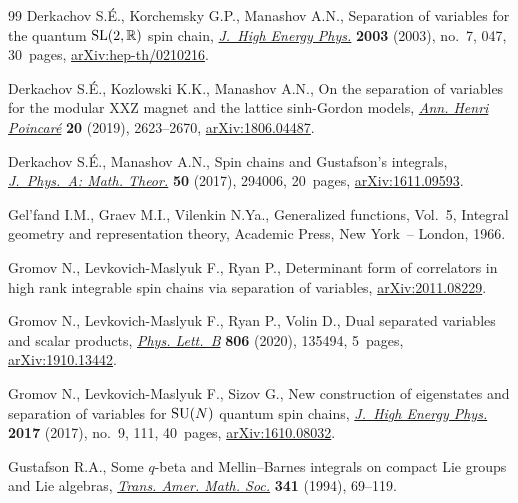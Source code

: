 \documentclass[pdftex]{sigma}%
\numberwithin{equation}{section}
\begin{document}
\begin{thebibliography}{99}
Derkachov S.\'E., Korchemsky G.P., Manashov A.N., Separation of variables for the
 quantum {${\rm SL}(2,\mathbb R)$} spin chain, \href{https://doi.org/10.1088/1126-6708/2003/07/047}{\textit{J.~High Energy Phys.}}
 \textbf{2003} (2003), no.~7, 047, 30~pages, \href{https://arxiv.org/abs/hep-th/0210216}{arXiv:hep-th/0210216}.

Derkachov S.\'E., Kozlowski K.K., Manashov A.N., On the separation of variables
 for the modular {XXZ} magnet and the lattice sinh-{G}ordon models,
 \href{https://doi.org/10.1007/s00023-019-00806-2}{\textit{Ann. Henri Poincar\'e}} \textbf{20} (2019), 2623--2670,
 \href{https://arxiv.org/abs/1806.04487}{arXiv:1806.04487}.

Derkachov S.\'E., Manashov A.N., Spin chains and {G}ustafson's integrals,
 \href{https://doi.org/10.1088/1751-8121/aa749a}{\textit{J.~Phys.~A: Math. Theor.}} \textbf{50} (2017), 294006, 20~pages,
 \href{https://arxiv.org/abs/1611.09593}{arXiv:1611.09593}.

Gel'fand I.M., Graev M.I., Vilenkin N.Ya., Generalized functions, {V}ol.~5,
 Integral geometry and representation theory, Academic Press, New York~--
 London, 1966.

Gromov N., Levkovich-Maslyuk F., Ryan P., Determinant form of correlators in high rank integrable spin chains via separation of variables,
 \href{https://arxiv.org/abs/2011.08229}{arXiv:2011.08229}.

Gromov N., Levkovich-Maslyuk F., Ryan P., Volin D., Dual separated variables
 and scalar products, \href{https://doi.org/10.1016/j.physletb.2020.135494}{\textit{Phys. Lett.~B}} \textbf{806} (2020), 135494,
 5~pages, \href{https://arxiv.org/abs/1910.13442}{arXiv:1910.13442}.

Gromov N., Levkovich-Maslyuk F., Sizov G., New construction of eigenstates and
 separation of variables for {${\rm SU}(N)$} quantum spin chains,
 \href{https://doi.org/10.1007/jhep09(2017)111}{\textit{J.~High Energy Phys.}} \textbf{2017} (2017), no.~9, 111, 40~pages,
 \href{https://arxiv.org/abs/1610.08032}{arXiv:1610.08032}.

Gustafson R.A., Some {$q$}-beta and {M}ellin--{B}arnes integrals on compact
 {L}ie groups and {L}ie algebras, \href{https://doi.org/10.2307/2154615}{\textit{Trans. Amer. Math. Soc.}}
 \textbf{341} (1994), 69--119.


\end{thebibliography}
\end{document}
